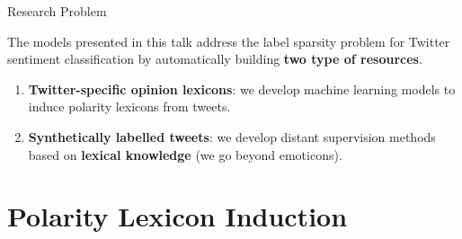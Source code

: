 \documentclass[handout]{beamer}
\begin{document}
\begin{frame}{Research Problem}

The models presented in this talk address the label sparsity problem for Twitter sentiment classification by automatically building \textbf{two type of resources}. 
\begin{enumerate}
 \item \textbf{Twitter-specific opinion lexicons}: we develop machine learning models to induce polarity lexicons from tweets. 
 \item  \textbf{Synthetically labelled tweets}: we develop distant supervision methods based on \textbf{lexical knowledge} (we go beyond emoticons). 
 \end{enumerate}

\end{frame}



\section{Polarity Lexicon Induction}
\end{document}

